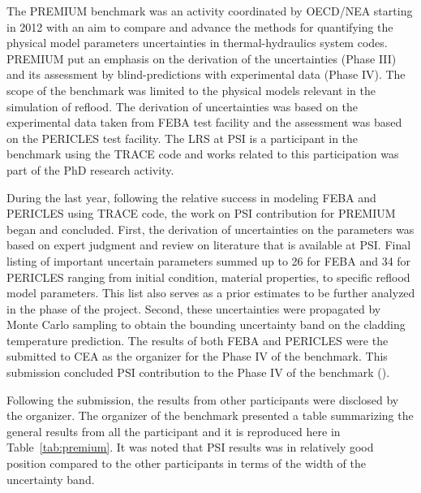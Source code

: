 \documentclass[11pt,titlepage]{article}
\begin{document}
The PREMIUM benchmark was an activity coordinated by OECD/NEA starting in 2012 
with an aim to compare and advance the methods for quantifying the physical 
model parameters uncertainties in thermal-hydraulics system codes.
PREMIUM put an emphasis on the derivation of the uncertainties (Phase III) and 
its assessment by blind-predictions with experimental data (Phase IV).
The scope of the benchmark was limited to the physical models relevant in the 
simulation of reflood.
The derivation of uncertainties was based on the experimental data taken from 
FEBA test facility and the assessment was based on the PERICLES test facility.
The LRS at PSI is a participant in the benchmark using the TRACE code and 
works related to this participation was part of the PhD research activity.

During the last year, following the relative success in modeling FEBA and 
PERICLES using TRACE code, the work on PSI contribution for PREMIUM began 
and concluded.
First, the derivation of uncertainties on the parameters was based on expert 
judgment and review on literature that is available at PSI.
Final listing of important uncertain parameters summed up to 26 for FEBA and 
34 for PERICLES ranging from initial condition, material properties, to 
specific reflood model parameters.
This list also serves as a prior estimates to be further analyzed 
in the phase of the project.
Second, these uncertainties were propagated by Monte Carlo sampling to obtain
the bounding uncertainty band on the cladding temperature prediction.
The results of both FEBA and PERICLES were the submitted to CEA as the 
organizer for the Phase IV of the benchmark. 
This submission concluded PSI contribution to the Phase IV of the benchmark 
(\cite{Wicaksono2014a, Wicaksono2014c}).

Following the submission, the results from other participants were disclosed by
the organizer.
The organizer of the benchmark presented a table summarizing the general 
results from all the participant and it is reproduced here in 
Table~\ref{tab:premium}.
It was noted that PSI results was in relatively good position compared to the
other participants in terms of the width of the uncertainty band.
\end{document}
